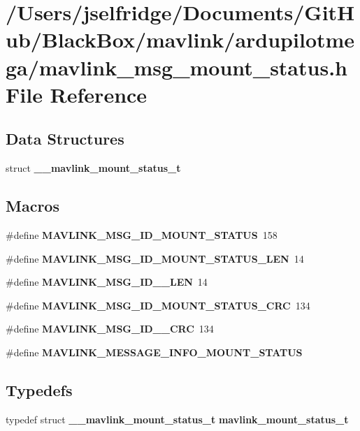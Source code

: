 \section{/\+Users/jselfridge/\+Documents/\+Git\+Hub/\+Black\+Box/mavlink/ardupilotmega/mavlink\+\_\+msg\+\_\+mount\+\_\+status.h File Reference}
\label{mavlink__msg__mount__status_8h}
\subsection*{Data Structures}
\begin{DoxyCompactItemize}
\item 
struct \textbf{ \+\_\+\+\_\+mavlink\+\_\+mount\+\_\+status\+\_\+t}
\end{DoxyCompactItemize}
\subsection*{Macros}
\begin{DoxyCompactItemize}
\item 
\#define \textbf{ M\+A\+V\+L\+I\+N\+K\+\_\+\+M\+S\+G\+\_\+\+I\+D\+\_\+\+M\+O\+U\+N\+T\+\_\+\+S\+T\+A\+T\+US}~158
\item 
\#define \textbf{ M\+A\+V\+L\+I\+N\+K\+\_\+\+M\+S\+G\+\_\+\+I\+D\+\_\+\+M\+O\+U\+N\+T\+\_\+\+S\+T\+A\+T\+U\+S\+\_\+\+L\+EN}~14
\item 
\#define \textbf{ M\+A\+V\+L\+I\+N\+K\+\_\+\+M\+S\+G\+\_\+\+I\+D\+\_\+\_\+\+L\+EN}~14
\item 
\#define \textbf{ M\+A\+V\+L\+I\+N\+K\+\_\+\+M\+S\+G\+\_\+\+I\+D\+\_\+\+M\+O\+U\+N\+T\+\_\+\+S\+T\+A\+T\+U\+S\+\_\+\+C\+RC}~134
\item 
\#define \textbf{ M\+A\+V\+L\+I\+N\+K\+\_\+\+M\+S\+G\+\_\+\+I\+D\+\_\+\_\+\+C\+RC}~134
\item 
\#define \textbf{ M\+A\+V\+L\+I\+N\+K\+\_\+\+M\+E\+S\+S\+A\+G\+E\+\_\+\+I\+N\+F\+O\+\_\+\+M\+O\+U\+N\+T\+\_\+\+S\+T\+A\+T\+US}
\end{DoxyCompactItemize}
\subsection*{Typedefs}
\begin{DoxyCompactItemize}
\item 
typedef struct \textbf{ \+\_\+\+\_\+mavlink\+\_\+mount\+\_\+status\+\_\+t} \textbf{ mavlink\+\_\+mount\+\_\+status\+\_\+t}
\end{DoxyCompactItemize}



